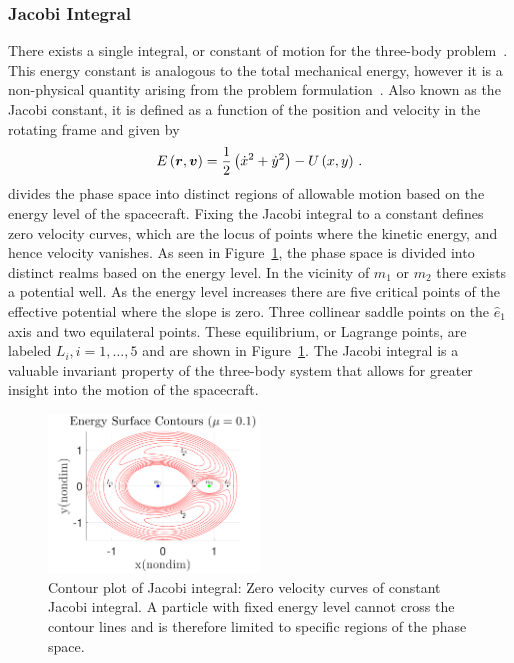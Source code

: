 \documentclass[smallcondensed]{svjour3}
\begin{document}
\subsubsection{Jacobi Integral}\label{sec:jacobi}
There exists a single integral, or constant of motion for the three-body problem~\cite{szebehely1967,lanczos1970}.
This energy constant is analogous to the total mechanical energy, however it is a non-physical quantity arising from the problem formulation~\cite{szebehely1967}.
Also known as the Jacobi constant, it is defined as a function of the position and velocity in the rotating frame and given by
\begin{equation}
        E\left( \bm{r} , \bm{v} \right) = \frac{1}{2}\left( \dot{x}^2 + \dot{y}^2\right) - U\left(x,y \right) \, .
        \label{eq:jacobi}
\end{equation}
 divides the phase space into distinct regions of allowable motion based on the energy level of the spacecraft.
Fixing the Jacobi integral to a constant defines zero velocity curves, which are the locus of points where the kinetic energy, and hence velocity vanishes.
As seen in Figure~\ref{fig:energy_contour}, the phase space is divided into distinct realms based on the energy level.
In the vicinity of \( m_1\) or \(m_2\) there exists a potential well. 
As the energy level increases there are five critical points of the effective potential where the slope is zero.
Three collinear saddle points on the \(\hat{e}_1\) axis and two equilateral points.
These equilibrium, or Lagrange points, are labeled \( L_i, i = 1, \hdots, 5 \) and are shown in Figure~\ref{fig:energy_contour}.
The Jacobi integral is a valuable invariant property of the three-body system that allows for greater insight into the motion of the spacecraft.
\begin{figure}[htbp]
        \centering
        \includegraphics[width=0.5\textwidth]{energy_contours}
        \caption{Contour plot of Jacobi integral: Zero velocity curves of constant Jacobi integral. A particle with fixed energy level cannot cross the contour lines and is therefore limited to specific regions of the phase space. }
        \label{fig:energy_contour}
\end{figure} 
\end{document}
